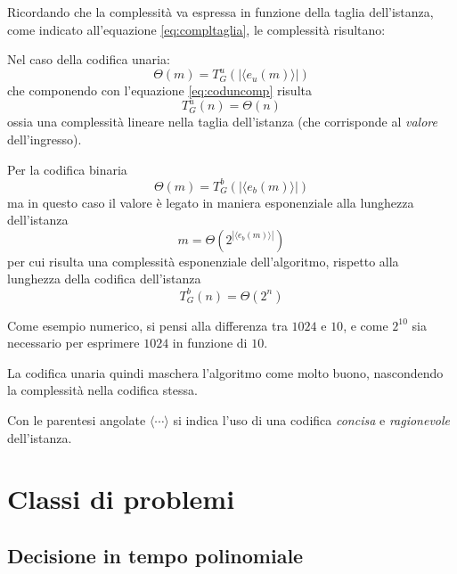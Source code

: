 Ricordando che la complessità va espressa in funzione della taglia dell'istanza, come indicato all'equazione \ref{eq:compltaglia}, le complessità risultano:

Nel caso della codifica unaria:
\begin{equation*}
    \Theta \left( m \right) = T_{G}^{u} \left( |\langle e_u(m) \rangle| \right)
\end{equation*}
che componendo con l'equazione \ref{eq:coduncomp} risulta
\begin{equation*}
    T_{G}^{u} \left( n \right) = \Theta\left( n \right)
\end{equation*}
ossia una complessità lineare nella taglia dell'istanza (che corrisponde al \emph{valore} dell'ingresso).

Per la codifica binaria
\begin{equation*}
    \Theta \left( m \right) = T_{G}^{b} \left( |\langle e_b(m) \rangle| \right)
\end{equation*}
ma in questo caso il valore è legato in maniera esponenziale alla lunghezza dell'istanza
\begin{equation*}
    m = \Theta \left( 2^{|\langle e_b(m) \rangle|} \right)
\end{equation*}
per cui risulta una complessità esponenziale dell'algoritmo, rispetto alla lunghezza della codifica dell'istanza
\begin{equation*}
    T_{G}^{b} \left( n \right) = \Theta \left( 2^n \right)
\end{equation*}

Come esempio numerico, si pensi alla differenza tra $1024$ e $10$, e come $2^{10}$ sia necessario per esprimere $1024$ in funzione di $10$.

La codifica unaria quindi maschera l'algoritmo come molto buono, nascondendo la complessità nella codifica stessa.

\begin{definition}
    \label{def:encodingconciso}
    Con le parentesi angolate $\langle \cdots \rangle$ si indica l'uso di una codifica \emph{concisa} e \emph{ragionevole} dell'istanza.
\end{definition}


\section{Classi di problemi}
\label{sse:classidiprob}

\subsection{Decisione in tempo polinomiale}

